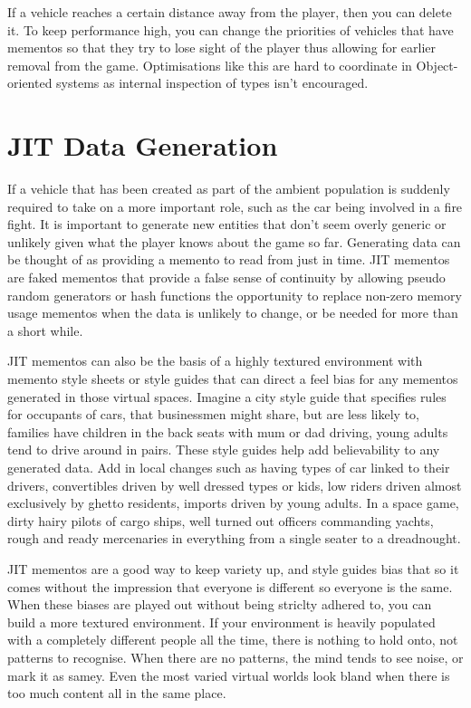 If a vehicle reaches a certain distance away from the player, then you can
delete it. To keep performance high, you can change the priorities of vehicles
that have mementos so that they try to lose sight of the player thus allowing
for earlier removal from the game. Optimisations like this are hard to
coordinate in Object-oriented systems as internal inspection of types isn't
encouraged.

\section{JIT Data Generation}

If a vehicle that has been created as part of the ambient population is
suddenly required to take on a more important role, such as the car being
involved in a fire fight. It is important to generate new entities that don't
seem overly generic or unlikely given what the player knows about the game so
far. Generating data can be thought of as providing a memento to read from just
in time. JIT mementos are faked mementos that provide a false sense of
continuity by allowing pseudo random generators or hash functions the
opportunity to replace non-zero memory usage mementos when the data is unlikely
to change, or be needed for more than a short while.

JIT mementos can also be the basis of a highly textured environment with
memento style sheets or style guides that can direct a feel bias for any
mementos generated in those virtual spaces. Imagine a city style guide that
specifies rules for occupants of cars, that businessmen might share, but are
less likely to, families have children in the back seats with mum or dad
driving, young adults tend to drive around in pairs. These style guides help
add believability to any generated data. Add in local changes such as having
types of car linked to their drivers, convertibles driven by well dressed types
or kids, low riders driven almost exclusively by ghetto residents, imports
driven by young adults. In a space game, dirty hairy pilots of cargo ships,
well turned out officers commanding yachts, rough and ready mercenaries in
everything from a single seater to a dreadnought.

JIT mementos are a good way to keep variety up, and style guides bias that so
it comes without the impression that everyone is different so everyone is the
same. When these biases are played out without being striclty adhered to, you
can build a more textured environment. If your environment is heavily populated
with a completely different people all the time, there is nothing to hold onto,
not patterns to recognise. When there are no patterns, the mind tends to see
noise, or mark it as samey. Even the most varied virtual worlds look bland when
there is too much content all in the same place.

